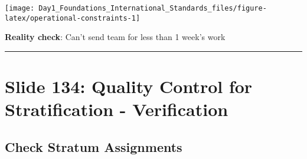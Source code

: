 \documentclass[
]{article}
\begin{document}
\texttt{[image: Day1\_Foundations\_International\_Standards\_files/figure-latex/operational-constraints-1]}

\textbf{Reality check}: Can't send team for less than 1 week's work

\begin{center}\rule{0.5\linewidth}{0.5pt}\end{center}

\section{Slide 134: Quality Control for Stratification -
Verification}\label{slide-134-quality-control-for-stratification---verification}

\subsection{Check Stratum Assignments}\label{check-stratum-assignments}
\end{document}
